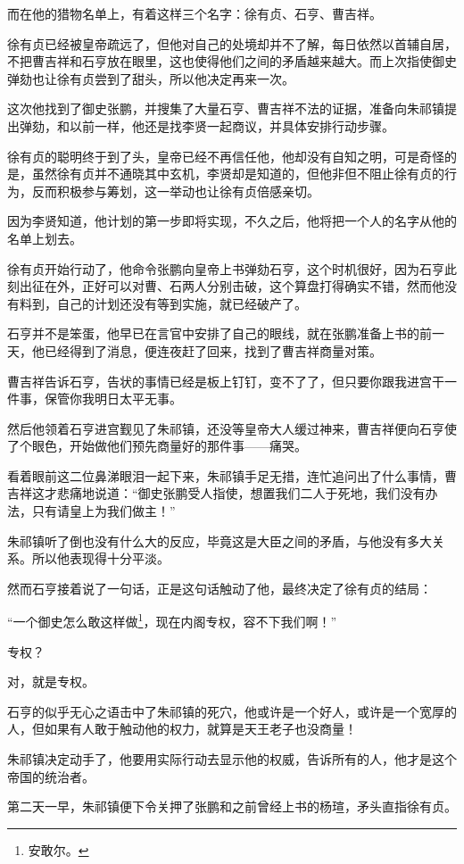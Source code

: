 \begin{multicols}{\theparacolNo}
而在他的猎物名单上，有着这样三个名字：徐有贞、石亨、曹吉祥。

徐有贞已经被皇帝疏远了，但他对自己的处境却并不了解，每日依然以首辅自居，不把曹吉祥和石亨放在眼里，这也使得他们之间的矛盾越来越大。而上次指使御史弹劾也让徐有贞尝到了甜头，所以他决定再来一次。

这次他找到了御史张鹏，并搜集了大量石亨、曹吉祥不法的证据，准备向朱祁镇提出弹劾，和以前一样，他还是找李贤一起商议，并具体安排行动步骤。

徐有贞的聪明终于到了头，皇帝已经不再信任他，他却没有自知之明，可是奇怪的是，虽然徐有贞并不通晓其中玄机，李贤却是知道的，但他非但不阻止徐有贞的行为，反而积极参与筹划，这一举动也让徐有贞倍感亲切。

因为李贤知道，他计划的第一步即将实现，不久之后，他将把一个人的名字从他的名单上划去。

徐有贞开始行动了，他命令张鹏向皇帝上书弹劾石亨，这个时机很好，因为石亨此刻出征在外，正好可以对曹、石两人分别击破，这个算盘打得确实不错，然而他没有料到，自己的计划还没有等到实施，就已经破产了。

石亨并不是笨蛋，他早已在言官中安排了自己的眼线，就在张鹏准备上书的前一天，他已经得到了消息，便连夜赶了回来，找到了曹吉祥商量对策。

曹吉祥告诉石亨，告状的事情已经是板上钉钉，变不了了，但只要你跟我进宫干一件事，保管你我明日太平无事。

然后他领着石亨进宫觐见了朱祁镇，还没等皇帝大人缓过神来，曹吉祥便向石亨使了个眼色，开始做他们预先商量好的那件事——痛哭。

看着眼前这二位鼻涕眼泪一起下来，朱祁镇手足无措，连忙追问出了什么事情，曹吉祥这才悲痛地说道：“御史张鹏受人指使，想置我们二人于死地，我们没有办法，只有请皇上为我们做主！”

朱祁镇听了倒也没有什么大的反应，毕竟这是大臣之间的矛盾，与他没有多大关系。所以他表现得十分平淡。

然而石亨接着说了一句话，正是这句话触动了他，最终决定了徐有贞的结局：

“一个御史怎么敢这样做\footnote{安敢尔。}，现在内阁专权，容不下我们啊！”

专权？

对，就是专权。

石亨的似乎无心之语击中了朱祁镇的死穴，他或许是一个好人，或许是一个宽厚的人，但如果有人敢于触动他的权力，就算是天王老子也没商量！

朱祁镇决定动手了，他要用实际行动去显示他的权威，告诉所有的人，他才是这个帝国的统治者。

第二天一早，朱祁镇便下令关押了张鹏和之前曾经上书的杨瑄，矛头直指徐有贞。


\end{multicols}
